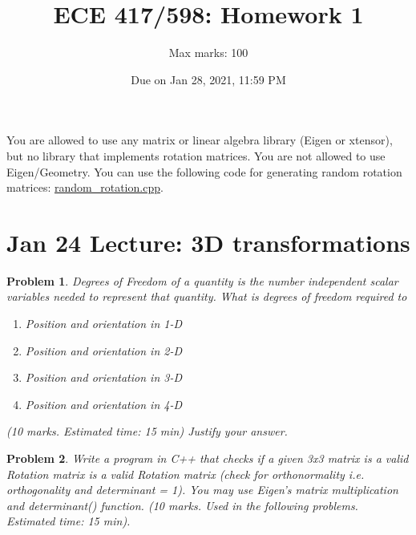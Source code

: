 \documentclass[twocolumn]{article}
\title{ECE 417/598: Homework 1}
\author{Max marks: 100}
\date{Due on Jan 28, 2021, 11:59 PM}
\newtheorem{prob}{Problem}
\newif\ifsol
\begin{document}
\maketitle

You are allowed to use any matrix or linear algebra library (Eigen or xtensor), but no
library that implements rotation matrices. You are not allowed to use
Eigen/Geometry. You can use the following code for generating random rotation matrices:
\href{https://github.com/wecacuee/ECE417-Mobile-Robots/blob/master/notebooks/random_rotation.cpp}{random\_rotation.cpp}.

\section{Jan 24 Lecture: 3D transformations}
\begin{prob}
  Degrees of Freedom of a quantity is the number independent scalar variables
  needed to represent that quantity. What is degrees of freedom required to 
  \begin{enumerate}
    \item Position and orientation in 1-D
    \item Position and orientation in 2-D
    \item Position and orientation in 3-D
    \item Position and orientation in 4-D
  \end{enumerate} (10 marks. Estimated time: 15 min)
  Justify your answer.
\end{prob}

\ifsol
\paragraph*{Solution}
\begin{enumerate}
  \item 1D: position requires 1-DoF,  orientation requires a binary flag.
  \item 2D: position requires 2-DoF, orientation requires a single angle: 1-DoF.
  \item 3D: position requires 3-DoF, orientation requires 3-DoF because there
    are three pairs of axis X-Y, Y-Z, Z-X.
  \item 4D: position requires 4-DoF, orientation requires 6-DoF because there
    are 6 pairs of axis: $^4C_2 = 6$.
\end{enumerate}
\fi

\begin{prob}
  Write a program in C++ that checks if a given
  3x3 matrix is a valid Rotation matrix is a valid Rotation matrix  (check for
  orthonormality i.e. orthogonality and determinant = 1). You may use Eigen's
  matrix multiplication and determinant() function. (10 marks. Used in the
  following problems. Estimated time: 15 min). 
\end{prob}
\end{document}

